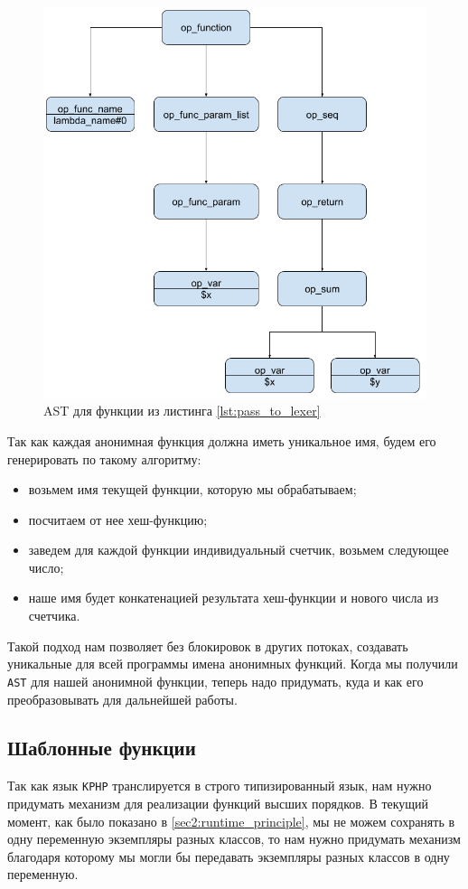 \begin{figure}[H]
    \caption{AST для функции из листинга \ref{lst:pass_to_lexer}}
    \label{fig:AST_for_sum}
    \centering
    \includegraphics[width=\linewidth]{images/ast_for_id}
\end{figure}

Так как каждая анонимная функция должна иметь уникальное имя, будем его генерировать по такому алгоритму:
\begin{itemize}
  \item возьмем имя текущей функции, которую мы обрабатываем;
  \item посчитаем от нее хеш-функцию;
  \item заведем для каждой функции индивидуальный счетчик, возьмем следующее число;
  \item наше имя будет конкатенацией результата хеш-функции и нового числа из счетчика.
\end{itemize}

Такой подход нам позволяет без блокировок в других потоках, создавать уникальные для всей программы имена анонимных функций.
Когда мы получили \verb|AST| для нашей анонимной функции, теперь надо придумать, куда и как его преобразовывать для дальнейшей работы.

\subsection{Шаблонные функции}
Так как язык \verb|KPHP| транслируется в строго типизированный язык, нам нужно придумать механизм для реализации функций высших порядков.
В текущий момент, как было показано в \ref{sec2:runtime_principle}, мы не можем сохранять в одну переменную экземпляры разных классов, то нам нужно придумать механизм благодаря которому мы могли бы передавать экземпляры разных классов в одну переменную.

